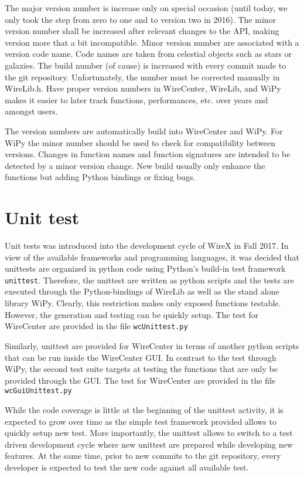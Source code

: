\documentclass[11pt,a4paper,onepage,openany]{book}
\begin{document}
The major version number is increase only on special occasion (until today, we
only took the step from zero to one and to version two in 2016). The minor
version number shall be
increased after relevant changes to the API, making version more that a bit
incompatible. Minor version number are associated with a version code name.
Code names are taken from celestial objects such as stars or galaxies. The
build number (of cause) is increased with every commit made to the git
repository. Unfortunately, the number must be corrected manually in WireLib.h.
Have proper version numbers in WireCenter, WireLib, and WiPy makes it easier
to later track functions, performances, etc. over years and amongst users.

The version numbers are automatically build into WireCenter and WiPy. For WiPy
the minor number should be used to check for compatibility between versions.
Changes in function names and function signatures are intended to be detected
by a minor version change. New build usually only enhance the functions but
adding Python bindings or fixing bugs.

\section{Unit test}
Unit tests was introduced into the development cycle of WireX in Fall 2017. In
view of the available frameworks and programming languages, it was decided that
unittests are organized in python code using Python's build-in test framework
\texttt{unittest}. Therefore, the unittest are written as python scripts and
the tests are executed through the Python-bindings of WireLib as well as the
stand alone library WiPy. Clearly, this restriction makes only exposed
functions testable. However, the generation and testing can be quickly setup.
The test for WireCenter are provided in the file \texttt{wcUnittest.py}

Similarly, unittest are provided for WireCenter in terms of another python
scripts that can be run inside the WireCenter GUI. In contrast to the test
through WiPy, the second test suite targets at testing the functions that are
only be provided through the GUI. The test for WireCenter are provided in the
file \texttt{wcGuiUnittest.py}

While the code coverage is little at the beginning of the unittest activity, it
is expected to grow over time as the simple test framework provided allows to
quickly setup new test. More importantly, the unittest allows to switch to a
test driven development cycle where new unittest are prepared while developing
new features. At the same time, prior to new commits to the git repository,
every developer is expected to test the new code against all available test.
\end{document}
